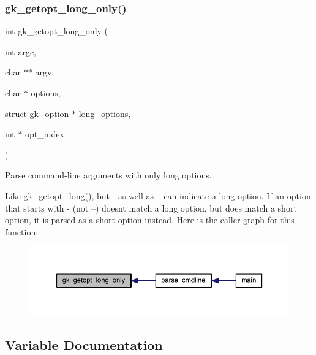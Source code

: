 \subsubsection{\texorpdfstring{gk\+\_\+getopt\+\_\+long\+\_\+only()}{gk\_getopt\_long\_only()}}
{\footnotesize\ttfamily int gk\+\_\+getopt\+\_\+long\+\_\+only (\begin{DoxyParamCaption}\item[{int}]{argc,  }\item[{char $\ast$$\ast$}]{argv,  }\item[{char $\ast$}]{options,  }\item[{struct \hyperlink{a00630}{gk\+\_\+option} $\ast$}]{long\+\_\+options,  }\item[{int $\ast$}]{opt\+\_\+index }\end{DoxyParamCaption})}



Parse command-\/line arguments with only long options. 

Like \hyperlink{a00038_a1c3b8d80bd9620dc66f24d4854c0f6d3}{gk\+\_\+getopt\+\_\+long()}, but \textquotesingle{}-\/\textquotesingle{} as well as \textquotesingle{}--\textquotesingle{} can indicate a long option. If an option that starts with \textquotesingle{}-\/\textquotesingle{} (not \textquotesingle{}--\textquotesingle{}) doesn\textquotesingle{}t match a long option, but does match a short option, it is parsed as a short option instead. Here is the caller graph for this function\+:\nopagebreak
\begin{figure}[H]
\begin{center}
\leavevmode
\includegraphics[width=350pt]{a00038_abb224612ca0aae2d39bd87f6146bd67d_icgraph}
\end{center}
\end{figure}


\subsection{Variable Documentation}
\mbox{\label{a00038_a71cb36f19824a1b843b9f1e067337d52}} 
